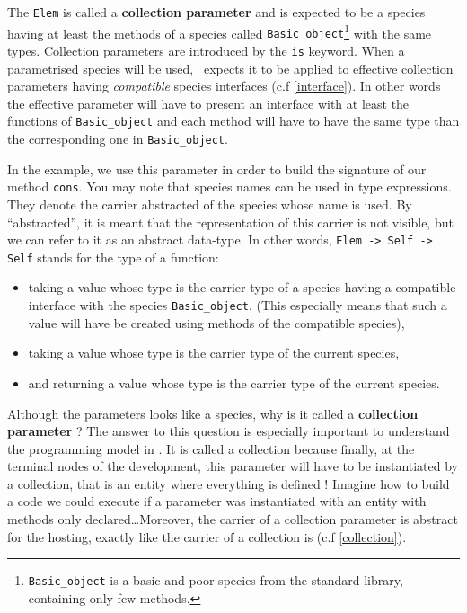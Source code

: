 The {\tt Elem} is called a {\bf collection parameter} and is expected
to be a species having at least the methods of a species called
{\tt Basic\_object}\footnote{{\tt Basic\_object} is a basic and poor
species from the standard library, containing only few methods.} with
the same types. Collection parameters are introduced by the {\tt is}
keyword. When a parametrised species will be used, \focal\ expects it
to be applied to effective collection parameters having
{\em compatible}
species interfaces (c.f \ref{interface}). In other words the effective
parameter will have to present an interface with at least the
functions of {\tt Basic\_object} and each method will have to have the
same type than the corresponding one in {\tt Basic\_object}.

\smallskip
In the example, we use this parameter in order to build the signature
of our method {\tt cons}. You may note that species names can be used
in type expressions. They denote the carrier abstracted of the species
whose name is used. By ``abstracted'', it is meant that the
representation of this carrier is not visible, but we can refer to it
as an abstract data-type. In other words, {\tt Elem -> Self -> Self}
stands for the type of a function:
\begin{itemize}
  \item taking a value whose type is the carrier type of a species
    having a compatible interface with the species
    {\tt Basic\_object}. (This especially means that such a value will
    have be created using methods of the compatible species),
  \item taking a value whose type is the carrier type of the current
    species,
  \item and returning a value whose type is the carrier type of the
    current species.
\end{itemize}

\smallskip
Although the parameters looks like a species, why is it called a
{\bf collection parameter} ? The answer to this question is especially
important to understand the programming model in \focal. It is called
a collection because finally, at the terminal nodes of the
development, this parameter will have to be instantiated by a
collection, that is an entity where everything is defined ! Imagine
how to build a code we could execute if a parameter was instantiated
with an entity with methods only declared\ldots Moreover, the carrier
of a collection parameter is abstract for the hosting, exactly like
the carrier of a collection is (c.f \ref{collection}).


